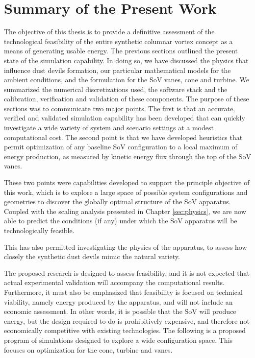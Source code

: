 \label{sec:conclusions}

%
%

%
%

\section{Summary of the Present Work}

The objective of this thesis is to provide a definitive assessment of
the technological feasibility of the entire synthetic columnar vortex
concept as a means of generating usable energy. The previous sections
outlined the present state of the simulation capability. In doing so, we
have discussed the physics that influence dust devils formation, our
particular mathematical models for the ambient conditions, and the
formulation for the SoV vanes, cone and turbine. We summarized the
numerical discretizations used, the software stack and the calibration,
verification and validation of these components. The purpose of these
sections was to communicate two major points. The first is that an
accurate, verified and validated simulation capability has been
developed that can quickly investigate a wide variety of system and
scenario settings at a modest computational cost. The second point is
that we have developed heuristics that permit optimization of any
baseline SoV configuration to a local maximum of energy production, as
measured by kinetic energy flux through the top of the SoV vanes.  

These two points were capabilities developed to support the principle
objective of this work, which is to explore a large space of possible
system configurations and geometries to discover the globally optimal
structure of the SoV apparatus. Coupled with the scaling analysis
presented in Chapter \ref{sec:physics}, we are now able to predict
the conditions (if any) under which the SoV apparatus will be
technologically feasible. 

This has also permitted investigating the physics of the apparatus, to
assess how closely the synthetic dust devils mimic the natural
variety. 

%
%
The proposed research is designed to assess feasibility, and it is not
expected that actual experimental validation will accompany the
computational results. Furthermore, it must also be emphasized that
feasibility is focused on technical viability, namely energy produced by
the apparatus, and will not include an economic assessment. In other
words, it is possible that the SoV will produce energy, but the design
required to do is prohibitively expensive, and therefore not
economically competitive with existing technologies. The following is a
proposed program of simulations  designed to explore a wide
configuration space. This focuses on optimization for the cone, turbine and vanes. 


